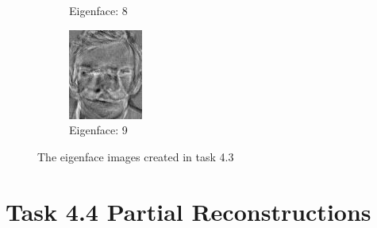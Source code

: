 \documentclass[12pt]{article}
\begin{document}
\begin{figure}
\begin{subfigure}[b]{0.20\textwidth}
		\caption{Eigenface: 8}
	\end{subfigure}\quad
	\begin{subfigure}[b]{0.20\textwidth}
		\includegraphics[width=\textwidth]{Task4.3_Images/PrincipalComponent9.jpg}
		\caption{Eigenface: 9}
	\end{subfigure}\quad
	\caption[Plots of eigenface images created in task 4.3]{\label{fig:task4.3Eigenfaces} The eigenface images created in task 4.3}
\end{figure}


\newpage
\thispagestyle{plain}
\mbox{}

\section {Task 4.4 Partial Reconstructions}
\label{sec:task4.4PartialReconstructions}
\end{document}
